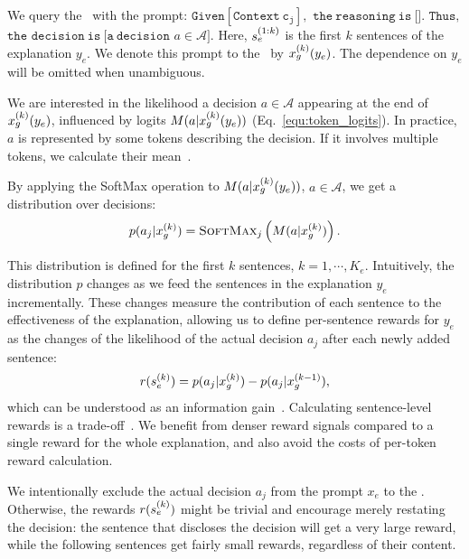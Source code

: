 We query the \rlm~with the prompt: $\mathtt{Given}$\newline$\mathtt{[Context\ c_j],}$ $\mathtt{the\ reasoning\ is\ [}$\idx[s][e][1:k]$\mathtt{].}$ $\mathtt{Thus,}$ $\mathtt{the}$ $\mathtt{decision\ is\ [a\ decision}$ $a\in\mathcal{A}\mathtt{]}$. Here, $\idx[s][e][1:k]$ is the first $k$ sentences of the explanation $y_e$. We denote this prompt to the \rlm~by $\idx[x][g][k][y_e]$. The dependence on $y_e$ will be omitted when unambiguous. 

We are interested in the likelihood a decision $a\in\mathcal{A}$ appearing at the end of $\idx[x][g][k][y_e]$, influenced by logits $M(a | \idx[x][g][k][y_e])$ (Eq.~\ref{equ:token_logits}). In practice, $a$ is represented by some tokens describing the decision. If it involves multiple tokens, we calculate their mean~\citep{yang2022logit}.

By applying the SoftMax operation to $M(a | \idx[x][g][k][y_e])$, $a\in\mathcal{A}$, we get a distribution over decisions:
\begin{align}
    p(a_j | \idx[x][g][k]) = \textsc{SoftMax}_j\left(M(a | \idx[x][g][k])\right).
\end{align}

This distribution is defined for the first $k$ sentences, $k=1,\cdots,K_e$. Intuitively, the distribution $p$ changes as we feed the sentences in the explanation $y_e$ incrementally. These changes measure the contribution of each sentence to the effectiveness of the explanation, allowing us to define per-sentence rewards for $y_e$ as the changes of the likelihood of the actual decision $a_j$ after each newly added sentence:
\begin{align}
     r(\idx[s][e][k]) = p(a_j | \idx[x][g][k]) - p(a_j | \idx[x][g][k-1]),\label{equ:elm_reward}
\end{align}
which can be understood as an information gain~\citep{ton2024understanding}. Calculating sentence-level rewards is a trade-off~\citep{deepseekai2025deepseekr1incentivizingreasoningcapability}. We benefit from denser reward signals compared to a single reward for the whole explanation, and also avoid the costs of per-token reward calculation.

We intentionally exclude the actual decision $a_j$ from the prompt $x_e$ to the \elm. Otherwise, the rewards $r(\idx[s][e][k])$ might be trivial and encourage merely restating the decision: the sentence that discloses the decision will get a very large reward, while the following sentences get fairly small rewards, regardless of their content.

